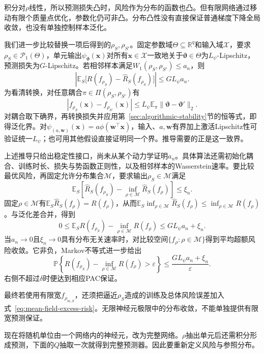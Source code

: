 积分对$\rho$线性，所以预测损失凸时，风险作为分布的函数也凸。但有限网络通过移动有限个质量点优化，参数化仍可非凸。分布凸性没有直接保证普通梯度下降全局收敛，也没有单独控制样本泛化。

我们进一步比较替换一项后得到的$\rho_S,\rho_{S'}$。固定参数域$\Theta\subseteq\mathbb R^q$和输入域$\mathcal X$，要求$\rho_S\in\mathcal P_1(\Theta)$，单元输出$\psi_{\bm\vartheta}(\bm x)$对所有$\bm x\in\mathcal X$一致地关于$\bm\vartheta\in\Theta$为$L_\psi$-Lipschitz，预测损失为$G$-Lipschitz。若相邻样本满足$W_1(\rho_S,\rho_{S'})\leq a_n$，则
\[
 \left|\mathbb E_S\bigl[R(f_{\rho_S})-\hat R_S(f_{\rho_S})\bigr]\right|
 \leq G L_\psi a_n.
\]
为看清转换，对任意耦合$\pi\in\Pi(\rho_S,\rho_{S'})$有
\[
 |f_{\rho_S}(\bm x)-f_{\rho_{S'}}(\bm x)|
 \leq L_\psi\mathbb E_\pi
       \|\bm\vartheta-\bm\vartheta'\|_2.
\]
对耦合取下确界，再转换损失并应用第~\ref{sec:algorithmic-stability}节的恒等式，即得泛化界。对$\psi_{(a,\bm w)}(\bm x)=a\phi(\bm w^\top\bm x)$，输入、$a,\bm w$有界加上激活Lipschitz性可验证统一$L_\psi$；也可用其他假设直接证明同一个界。推导需要的正是这一致界。

上述推导只给出稳定性接口，尚未从某个动力学证明$a_n$。具体算法还需初始化耦合、训练时长、损失与势函数正则性，以及相邻样本的Wasserstein速率。要比较最优风险，再固定允许分布集合$\mathcal M$，要求输出$\rho_S\in\mathcal M$满足
\[
 \mathbb E_S\left[
   \hat R_S(f_{\rho_S})
   -\inf_{\rho\in\mathcal M}\hat R_S(f_\rho)
 \right]\leq\xi_n.
\]
固定$\rho\in\mathcal M$有$\mathbb E_S\hat R_S(f_\rho)=R(f_\rho)$，从而$\mathbb E_S\inf_{\rho\in\mathcal M}\hat R_S(f_\rho)\leq\inf_{\rho\in\mathcal M}R(f_\rho)$。与泛化差合并，得到
\begin{equation}
 0\leq
 \mathbb E_S R(f_{\rho_S})
 -\inf_{\rho\in\mathcal M}R(f_\rho)
 \leq G L_\psi a_n+\xi_n.
 \label{eq:mean-field-excess-risk}
\end{equation}
当$a_n\to0$且$\xi_n\to0$具有分布无关速率时，对比较空间$\{f_\rho:\rho\in\mathcal M\}$得到平均超额风险收敛。它非负，Markov不等式进一步给出
\[
 \mathbb P\left\{
 R(f_{\rho_S})-\inf_{\rho\in\mathcal M}R(f_\rho)>\varepsilon
 \right\}
 \leq\frac{G L_\psi a_n+\xi_n}{\varepsilon}.
\]
右侧不超过$\delta$时便达到相应PAC保证。

最终若使用有限宽$f_{\rho_{m,S}}$，还须把逼近$\rho_S$造成的训练及总体风险误差加入式~\eqref{eq:mean-field-excess-risk}。无限神经元极限中的分布收敛，不能单独提供有限宽预测保证。

现在将随机单位由一个网络内的神经元，改为完整网络。$\rho$抽出单元后还需积分形成预测，下面的$Q$抽取一次就得到完整预测器。因此要重新定义风险与参照分布。

